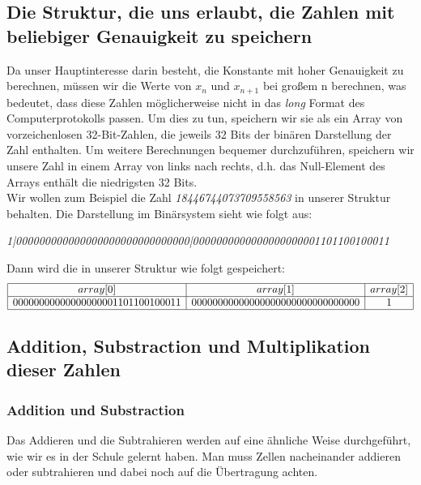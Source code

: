 \documentclass[course=erap]{aspdoc}
\begin{document}
\subsection{Die Struktur, die uns erlaubt, die Zahlen mit beliebiger Genauigkeit zu speichern}%
Da unser Hauptinteresse darin besteht, die Konstante mit hoher Genauigkeit zu berechnen, müssen wir die Werte von $x_n$ und $x_{n+1}$ bei großem n berechnen, was bedeutet, dass diese Zahlen möglicherweise nicht in das \textit{long} Format des Computerprotokolls passen. Um dies zu tun, speichern wir sie als ein Array von vorzeichenlosen 32-Bit-Zahlen, die jeweils 32 Bits der binären Darstellung der Zahl enthalten. Um weitere Berechnungen bequemer durchzuführen, speichern wir unsere Zahl in einem Array von links nach rechts, d.h. das Null-Element des Arrays enthält die niedrigsten 32 Bits.\\
Wir wollen zum Beispiel die Zahl \textit{18446744073709558563} in unserer Struktur behalten. Die Darstellung im Binärsystem sieht wie folgt aus: \\
\centerline{\textit{1|000000000000000000000000000000|0000000000000000000001101100100011}}
Dann wird die in unserer Struktur wie folgt gespeichert:
\begin{equation*}
\begin{array}{|c|c|c|}\hline
array[0] & array[1] & array[2]\\
\hline
00000000000000000001101100100011 & 00000000000000000000000000000000 & 1\\ 
\hline
\end{array}
\end{equation*}
\subsection{Addition, Substraction und Multiplikation dieser Zahlen}%
\subsubsection{Addition und Substraction}%
Das Addieren und die Subtrahieren werden auf eine ähnliche Weise durchgeführt, wie wir es in der Schule gelernt haben. Man muss Zellen nacheinander addieren oder subtrahieren und dabei noch auf die Übertragung achten.
\end{document}
